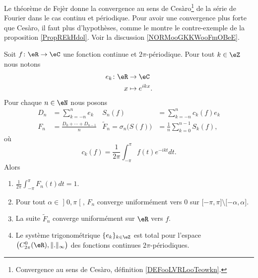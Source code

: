 Le théorème de Fejèr donne la convergence au sens de Cesàro\footnote{Convergence au sens de Cesàro, définition \ref{DEFooLVRLooTeowkn}.} de la série de Fourier dans le cas continu et périodique. Pour avoir une convergence plus forte que Cesàro, il faut plus d'hypothèses, comme le montre le contre-exemple de la proposition \ref{PropREkHdol}. Voir la discussion \ref{NORMooGKKWooFmOBeE}.
\begin{theorem}[Fejèr]      \label{ThoJFqczow}
	Soit \( f\colon \eR\to \eC\) une fonction continue et \( 2\pi\)-périodique. Pour tout \( k\in \eZ\) nous notons
	\begin{equation}
		\begin{aligned}
			e_k\colon \eR & \to \eC          \\
			x             & \mapsto e^{ikx}.
		\end{aligned}
	\end{equation}
	Pour chaque \( n\in \eN\) nous posons
	\begin{subequations}
		\begin{align}
			D_n & =\sum_{k=-n}^ne_k                   & S_n(f)                              & =\sum_{k=-n}^nc_k(f)e_k               \\
			F_n & =\frac{ D_0+\cdots + D_{n-1} }{ n } & \tilde F_n=\sigma_n\big( S(f) \big) & =\frac{1}{ n }\sum_{k=0}^{n-1}S_k(f),
		\end{align}
	\end{subequations}
	où
	\begin{equation}
		c_k(f)=\frac{1}{ 2\pi }\int_{-\pi}^{\pi}f(t) e^{-ikt}dt.
	\end{equation}
	Alors
	\begin{enumerate}
		\item
		      \( \frac{1}{ 2\pi }\int_{-\pi}^{\pi}F_n(t)dt=1\).
		\item
		      Pour tout \( \alpha\in \mathopen] 0 , \pi \mathclose[\), \( F_n\) converge uniformément vers \( 0\) sur \( \mathopen[ -\pi , \pi \mathclose]\setminus\mathopen[ -\alpha , \alpha \mathclose]\).
		\item
		      La suite \( \tilde F_n \) converge uniformément sur \( \eR\) vers \( f\).
		\item   \label{ItemUNQSPmyiv}
		      Le système trigonométrique \( \{ e_k \}_{k\in\eZ}\) est total pour l'espace \( \big( C^0_{2\pi}(\eR),\| . \|_{\infty} \big)\) des fonctions continues \( 2\pi\)-périodiques.
	\end{enumerate}
\end{theorem}

